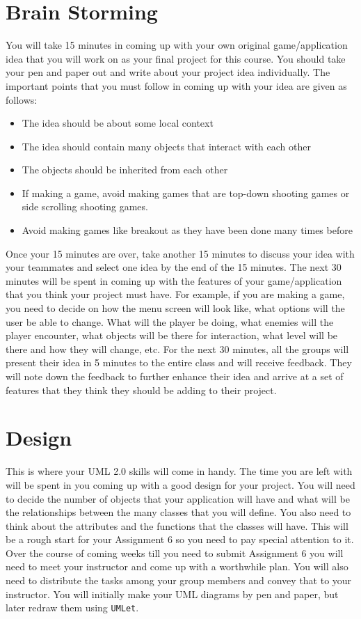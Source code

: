 \documentclass[11pt,fleqn]{book} %
\begin{document}
\section{Brain Storming}
You will take 15 minutes in coming up with your own original game/application idea that you will work on as your final project for this course. You should take your pen and paper out and write about your project idea individually. The important points that you must follow in coming up with your idea are given as follows:
\begin{itemize}
\item The idea should be about some local context
\item The idea should contain many objects that interact with each other
\item The objects should be inherited from each other
\item If making a game, avoid making games that are top-down shooting games or side scrolling
shooting games.
\item Avoid making games like breakout as they have been done many times before
\end{itemize}
Once your 15 minutes are over, take another 15 minutes to discuss your idea with your teammates and select one idea by the end of the 15 minutes. The next 30 minutes will be spent in coming up with the features of your game/application that you think your project must have. For example, if you are making a game, you need to decide on how the menu screen will look like, what options will the user be able to change. What will the player be doing, what enemies will the player encounter, what objects will be there for interaction, what level will be there and how they will change, etc. For the next 30 minutes, all the groups will present their idea in 5 minutes to the entire class and will receive feedback. They will note down the feedback to further enhance their idea and arrive at a set of features that they think they should be adding to their project.

\section{Design}

This is where your UML 2.0 skills will come in handy. The time you are left with will be spent in you coming up with a good design for your project. You will need to decide the number of objects that your application will have and what will be the relationships between the many classes that you will define. You also need to think about the attributes and the functions that the classes will have. This will be a rough start for your Assignment 6 so you need to pay special attention to it. Over the course of coming weeks till you need to submit Assignment 6 you will need to meet your instructor and come up with a worthwhile plan. You will also need to distribute the tasks among your group members and convey that to your instructor. You will initially make your UML diagrams by pen and paper, but later redraw them using {\tt UMLet}.
\end{document}
